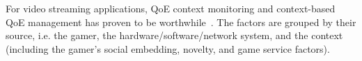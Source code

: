 For video streaming applications, \gls{QoE} context
monitoring and context-based \gls{QoE} management has proven to be
worthwhile~\cite{7140480}. The factors are grouped by
their source, i.e. the gamer, the hardware/software/network system,
and the context (including the gamer's social embedding, novelty,
and game service factors).
